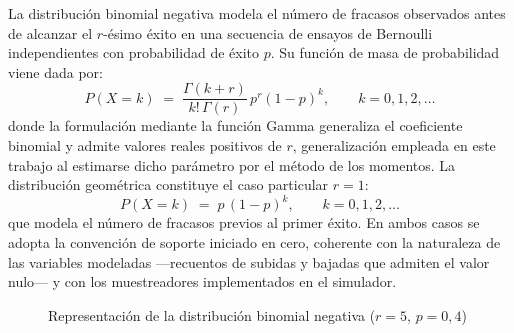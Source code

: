 La distribución binomial negativa modela el número de fracasos observados
antes de alcanzar el $r$-ésimo éxito en una secuencia de ensayos de Bernoulli
independientes con probabilidad de éxito $p$. Su función de masa de
probabilidad viene dada por:
\begin{equation}
P(X = k) \;=\; \frac{\Gamma(k + r)}{k!\,\Gamma(r)}\, p^{r} (1-p)^{k},
\qquad k = 0, 1, 2, \ldots
\label{eq:nbinom}
\end{equation}
donde la formulación mediante la función Gamma generaliza el coeficiente
binomial y admite valores reales positivos de $r$, generalización empleada
en este trabajo al estimarse dicho parámetro por el método de los momentos.
La distribución geométrica constituye el caso particular $r = 1$:
\begin{equation}
P(X = k) \;=\; p\,(1-p)^{k}, \qquad k = 0, 1, 2, \ldots
\label{eq:geom}
\end{equation}
que modela el número de fracasos previos al primer éxito. En ambos casos se
adopta la convención de soporte iniciado en cero, coherente con la naturaleza
de las variables modeladas ---recuentos de subidas y bajadas que admiten el
valor nulo--- y con los muestreadores implementados en el simulador.


\begin{figure}[h]
\centering
{}
\caption{Representación de la distribución binomial negativa 
($r=5$, $p=0{,}4$)}
\par\vspace{2pt}{\footnotesize Fuente: elaboración propia.}\label{fig:negbin}
\end{figure}


